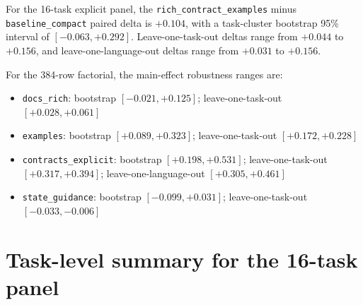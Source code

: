 \documentclass[11pt]{article}
\begin{document}
For the 16-task explicit panel, the \texttt{rich\_contract\_examples} minus \texttt{baseline\_compact} paired delta is $+0.104$, with a task-cluster bootstrap 95\% interval of $[-0.063, +0.292]$. Leave-one-task-out deltas range from $+0.044$ to $+0.156$, and leave-one-language-out deltas range from $+0.031$ to $+0.156$.

For the 384-row factorial, the main-effect robustness ranges are:
\begin{itemize}
  \item \texttt{docs\_rich}: bootstrap $[-0.021, +0.125]$; leave-one-task-out $[+0.028, +0.061]$
  \item \texttt{examples}: bootstrap $[+0.089, +0.323]$; leave-one-task-out $[+0.172, +0.228]$
  \item \texttt{contracts\_explicit}: bootstrap $[+0.198, +0.531]$; leave-one-task-out $[+0.317, +0.394]$; leave-one-language-out $[+0.305, +0.461]$
  \item \texttt{state\_guidance}: bootstrap $[-0.099, +0.031]$; leave-one-task-out $[-0.033, -0.006]$
\end{itemize}

\section{Task-level summary for the 16-task panel}
\end{document}
